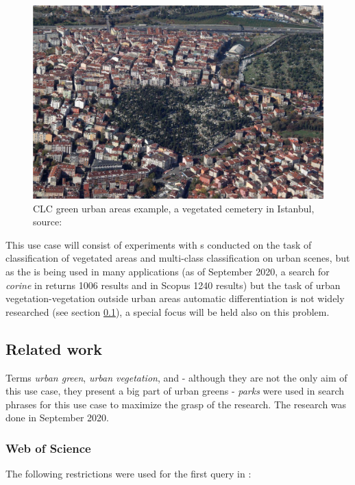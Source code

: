 \begin{figure}[h]
   \centering
	\includegraphics[width=0.6\linewidth]{./pictures/urban-vegetation-clc-02.png}
	\caption[CLC green urban areas example, vegetated cemetery]{CLC green urban areas example, a vegetated cemetery in Istanbul, source: \cite{clc-nomenclature}}
      \label{fig-urban-green-2}
\end{figure}

This use case will consist of experiments with s conducted on the task of classification of vegetated areas and multi-class classification on urban scenes, but as the  is being used in many applications (as of September 2020, a search for \textit{corine} in  returns 1006 results and in Scopus 1240 results) but the task of urban vegetation-vegetation outside urban areas automatic differentiation is not widely researched (see section \ref{urban-green-situation}), a special focus will be held also on this problem.

\subsection{Related work}
\label{urban-green-situation}

Terms \textit{urban green}, \textit{urban vegetation}, and - although they are not the only aim of this use case, they present a big part of urban greens - \textit{parks} were used in search phrases for this use case to maximize the grasp of the research. The research was done in September 2020.

\subsubsection{Web of Science}
\label{urban-green-wos}

The following restrictions were used for the first query in :

